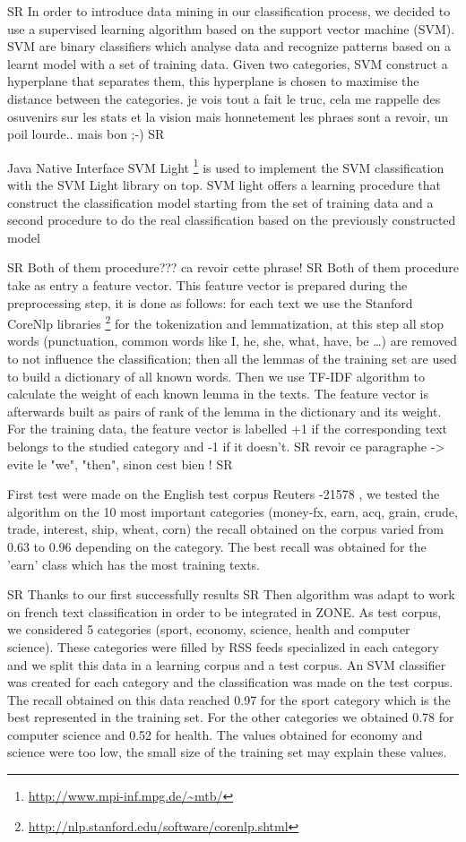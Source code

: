 \documentclass{llncs}
\begin{document}
SR In order to introduce data mining in our classification process, we decided to use a supervised learning algorithm based on the support vector machine (SVM). SVM are binary classifiers which analyse data and recognize patterns based on a learnt model with a set of training data. Given two categories, SVM construct a hyperplane that separates them, this hyperplane is chosen to maximise the distance between the categories.
je vois tout a fait le truc, cela me rappelle des osuvenirs sur les stats et la vision mais honnetement les phraes sont a revoir, un poil lourde.. mais bon ;-) SR

Java Native Interface SVM Light \footnote{\url{http://www.mpi-inf.mpg.de/~mtb/}} is used to implement the SVM classification with the SVM Light library \cite{joachim:svmlight} on top. SVM light offers a learning procedure that construct the classification model starting from the set of training data and a second procedure to do the real classification based on the previously constructed model

SR Both of them procedure??? ca revoir cette phrase! SR
Both of them procedure take as entry a feature vector. This feature vector is prepared during the preprocessing step, it is done as follows: for each text we use the Stanford CoreNlp libraries \footnote{\url{http://nlp.stanford.edu/software/corenlp.shtml}} for the tokenization and lemmatization, at this step all stop words (punctuation, common words like I, he, she, what, have, be …) are removed to not influence the classification; then all the lemmas of the training set are used to build a dictionary of all known words. Then we use TF-IDF algorithm to calculate the weight of each known lemma in the texts. The feature vector is afterwards built as pairs of rank of the lemma in the dictionary and its weight. For the training data, the feature vector is labelled +1 if the corresponding text belongs to the studied category and -1 if it doesn't.
SR revoir ce paragraphe -> evite le "we", "then", sinon cest bien ! SR

First test were made on the English test corpus Reuters -21578 \cite{lewis:reuters}, we tested the algorithm on the 10 most important categories (money-fx, earn, acq, grain, crude, trade, interest, ship, wheat, corn) the recall obtained on the corpus varied from 0.63 to 0.96 depending on the category. The best recall was obtained for the 'earn' class which has the most training texts.

SR Thanks to our first successfully results SR Then algorithm was adapt to work on french text classification in order to be integrated in ZONE. As test corpus, we considered 5 categories (sport, economy, science, health and computer science). These categories were filled by RSS feeds specialized in each category and we split this data in a learning corpus and a test corpus. An SVM classifier was created for each category and the classification was made on the test corpus. The recall obtained on this data reached 0.97 for the sport category which is the best represented in the training set. For the other categories we obtained 0.78 for computer science and 0.52 for health. The values obtained for economy and science were too low, the small size of the training set may explain these values.
\end{document}
